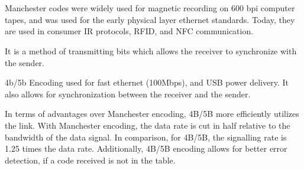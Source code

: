 \section{}

Manchester codes were widely used for magnetic recording on 600 bpi computer
tapes, and was used for the early physical layer ethernet standards.
Today, they are used in consumer IR protocols, RFID, and NFC communication.

It is a method of transmitting bits which allows the receiver to synchronize
with the sender.\footnotemark




4b/5b Encoding used for fast ethernet (100Mbps), and USB power delivery. It also
allows for synchronization between the receiver and the sender.\footnotemark
{}





In terms of advantages over Manchester encoding, 4B/5B more efficiently utilizes
the link. With Manchester encoding, the data rate is cut in half relative to the
bandwidth of the data signal.  In comparison, for 4B/5B, the signalling rate is
1.25 times the data rate. Additionally, 4B/5B encoding allows for better error
detection, if a code received is not in the table.
